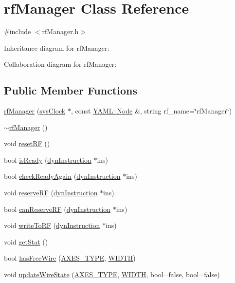 \hypertarget{classrfManager}{
\section{rfManager Class Reference}
\label{classrfManager}
}


{\ttfamily \#include $<$rfManager.h$>$}



Inheritance diagram for rfManager:


Collaboration diagram for rfManager:
\subsection*{Public Member Functions}
\begin{DoxyCompactItemize}
\item 
\hyperlink{classrfManager_ae3bf65fd10a88642a5599e9dc1f99a43}{rfManager} (\hyperlink{classsysClock}{sysClock} $\ast$, const \hyperlink{classYAML_1_1Node}{YAML::Node} \&, string rf\_\-name=\char`\"{}rfManager\char`\"{})
\item 
\hyperlink{classrfManager_adc5fb894c52570de06137128a65256e3}{$\sim$rfManager} ()
\item 
void \hyperlink{classrfManager_aca3886ea56db6dd13b096be05adee188}{resetRF} ()
\item 
bool \hyperlink{classrfManager_ab5c5242744de56fd2f46c11ac3d9472b}{isReady} (\hyperlink{classdynInstruction}{dynInstruction} $\ast$ins)
\item 
bool \hyperlink{classrfManager_a4d9ef9cb740f57a058efe2ffe3eb9554}{checkReadyAgain} (\hyperlink{classdynInstruction}{dynInstruction} $\ast$ins)
\item 
void \hyperlink{classrfManager_ab38c1244739ba189161c3026361464ec}{reserveRF} (\hyperlink{classdynInstruction}{dynInstruction} $\ast$ins)
\item 
bool \hyperlink{classrfManager_a487ae2b2c425f4a15a6ee49fe37d5afd}{canReserveRF} (\hyperlink{classdynInstruction}{dynInstruction} $\ast$ins)
\item 
void \hyperlink{classrfManager_ae5dc11fc5a35d9985601f94e0176d32d}{writeToRF} (\hyperlink{classdynInstruction}{dynInstruction} $\ast$ins)
\item 
void \hyperlink{classrfManager_ab33692b15e37a769b418bb528473ce2f}{getStat} ()
\item 
bool \hyperlink{classrfManager_a77cd0079b7bfe9be500a308e7464682e}{hasFreeWire} (\hyperlink{binaryTranslator_2global_8h_a94b8423a23b95a7adac22848b81e7c0c}{AXES\_\-TYPE}, \hyperlink{global_2global_8h_a6fa2e24b8a418fa215e183264cbea3aa}{WIDTH})
\item 
void \hyperlink{classrfManager_a9f6656aaab40c1eade70613096ca66f0}{updateWireState} (\hyperlink{binaryTranslator_2global_8h_a94b8423a23b95a7adac22848b81e7c0c}{AXES\_\-TYPE}, \hyperlink{global_2global_8h_a6fa2e24b8a418fa215e183264cbea3aa}{WIDTH}, bool=false, bool=false)
\end{DoxyCompactItemize}


